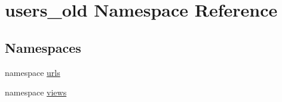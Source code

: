 \hypertarget{namespaceusers__old}{
\section{users\_\-old Namespace Reference}
\label{namespaceusers__old}
}
\subsection*{Namespaces}
\begin{DoxyCompactItemize}
\item 
namespace \hyperlink{namespaceusers__old_1_1urls}{urls}
\item 
namespace \hyperlink{namespaceusers__old_1_1views}{views}
\end{DoxyCompactItemize}

